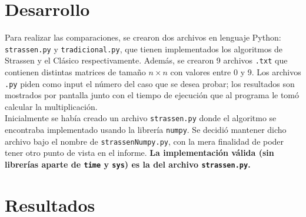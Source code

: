 \documentclass[a4paper,11pt]{article}
\begin{document}
\section{Desarrollo}
Para realizar las comparaciones, se crearon dos archivos en lenguaje Python: \texttt{strassen.py} y \texttt{tradicional.py}, que tienen implementados los algoritmos de Strassen y el Clásico respectivamente. Además, se crearon 9 archivos \texttt{.txt} que contienen distintas matrices de tamaño $n\times n$ con valores entre 0 y 9. Los archivos \texttt{.py} piden como input el número del caso que se desea probar; los resultados son mostrados por pantalla junto con el tiempo de ejecución que al programa le tomó calcular la multiplicación.\\

Inicialmente se había creado un archivo \texttt{strassen.py} donde el algoritmo se encontraba implementado usando la librería \texttt{numpy}. Se decidió mantener dicho archivo bajo el nombre de \texttt{strassenNumpy.py}, con la mera finalidad de poder tener otro punto de vista en el informe. \textbf{La implementación válida (sin librerías aparte de \texttt{time} y \texttt{sys}) es la del archivo \texttt{strassen.py}.}

\section{Resultados}
\end{document}
